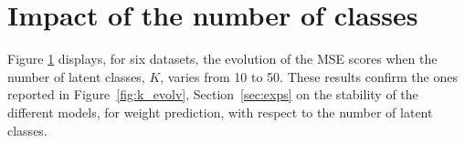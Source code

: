 \section{Impact of the number of classes}
\label{app:K}

\begin{figure}[ht]
\centering
	
   \label{fig:k_evolv-app}
\end{figure}

Figure \ref{fig:k_evolv-app} displays, for six datasets, the evolution of the MSE scores when the number of latent classes, $K$, varies from 10 to 50. These results confirm the ones reported in Figure~\ref{fig:k_evolv}, Section~\ref{sec:exps} on the stability of the different models, for weight prediction, with respect to the number of latent classes.
%
%
%
